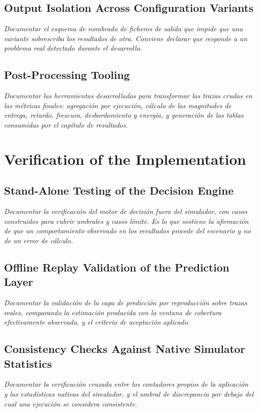 \subsection{Output Isolation Across Configuration Variants}
\emph{Documentar el esquema de nombrado de ficheros de salida que impide que una
variante sobrescriba los resultados de otra. Conviene declarar que responde a un
problema real detectado durante el desarrollo.}

\subsection{Post-Processing Tooling}
\emph{Documentar las herramientas desarrolladas para transformar las trazas
crudas en las métricas finales: agregación por ejecución, cálculo de las
magnitudes de entrega, retardo, frescura, desbordamiento y energía, y generación
de las tablas consumidas por el capítulo de resultados.}

\section{Verification of the Implementation}

\subsection{Stand-Alone Testing of the Decision Engine}
\emph{Documentar la verificación del motor de decisión fuera del simulador,
con casos construidos para cubrir umbrales y casos límite. Es lo que sostiene la
afirmación de que un comportamiento observado en los resultados procede del
escenario y no de un error de cálculo.}

\subsection{Offline Replay Validation of the Prediction Layer}
\emph{Documentar la validación de la capa de predicción por reproducción sobre
trazas reales, comparando la estimación producida con la ventana de cobertura
efectivamente observada, y el criterio de aceptación aplicado.}

\subsection{Consistency Checks Against Native Simulator Statistics}
\emph{Documentar la verificación cruzada entre los contadores propios de la
aplicación y las estadísticas nativas del simulador, y el umbral de discrepancia
por debajo del cual una ejecución se considera consistente.}

